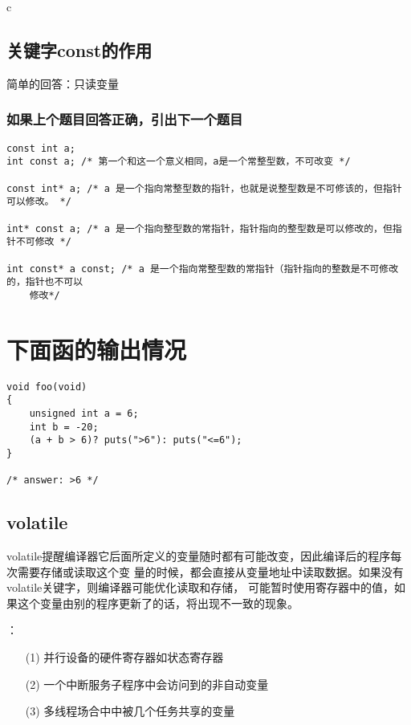 \documentclass{article}
\begin{document}
\begin{mitned}{c}
\subsection{关键字const的作用}
简单的回答：只读变量
\subsubsection{如果上个题目回答正确，引出下一个题目}
\begin{verbatim}
const int a; 
int const a; /* 第一个和这一个意义相同，a是一个常整型数，不可改变 */

const int* a; /* a 是一个指向常整型数的指针，也就是说整型数是不可修该的，但指针可以修改。 */

int* const a; /* a 是一个指向整型数的常指针，指针指向的整型数是可以修改的，但指针不可修改 */

int const* a const; /* a 是一个指向常整型数的常指针（指针指向的整数是不可修改的，指针也不可以
	修改*/ 
\end{verbatim}

\section{下面函的输出情况}
\begin{verbatim}
void foo(void)
{
	unsigned int a = 6;
	int b = -20;
	(a + b > 6)? puts(">6"): puts("<=6");
}

/* answer: >6 */

\end{verbatim}

\subsection{volatile}
volatile提醒编译器它后面所定义的变量随时都有可能改变，因此编译后的程序每次需要存储或读取这个变
量的时候，都会直接从变量地址中读取数据。如果没有volatile关键字，则编译器可能优化读取和存储，
可能暂时使用寄存器中的值，如果这个变量由别的程序更新了的话，将出现不一致的现象。


：

\begin{itemize}
\item[(1)] 并行设备的硬件寄存器如状态寄存器
\item[(2)] 一个中断服务子程序中会访问到的非自动变量
\item[(3)] 多线程场合中中被几个任务共享的变量
\end{itemize}


\end{mitned}
\end{document}
